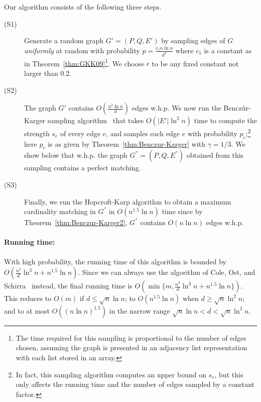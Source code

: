 \documentclass[11pt]{article}
\begin{document}
Our algorithm consists of the following three steps.

\begin{description}

\item[(S1)] Generate a random graph $G'=(P,Q,E')$ by sampling edges of $G$
  {\em uniformly} at random with probability $p = \frac{c_1 n \ln n}{d^2}$
  where $c_1$ is a constant as in Theorem~\ref{thm:GKK09}\footnote{The time
    required for this sampling is proportional to the number of edges chosen,
    assuming the graph is presented in an adjacency list representation with
    each list stored in an array.}.  We choose $\epsilon$ to be any fixed
  constant not larger than $0.2$.

\item[(S2)] The graph $G'$ contains $O( \frac{n^2 \ln n}{d})$ edges w.h.p. We
  now run the Bencz\'{u}r-Karger sampling algorithm~\cite{benczurkarger96} that
  takes $O(|E'|\ln^2 n)$ time to compute the strength $s_e$ of every edge $e$,
  and samples each edge $e$ with probability $p_e$;\footnote{In fact, this
    sampling algorithm computes an upper bound on $s_e$, but this only affects
    the running time and the number of edges sampled by a constant factor.}
  here $p_e$ is as given by Theorem~\ref{thm:Benczur-Karger} with $\gamma =
  1/3$. We show below that w.h.p. the graph $G^{''} = (P,Q,E^{''})$ obtained
  from this sampling contains a perfect matching.

\item[(S3)] Finally, we run the Hopcroft-Karp algorithm to obtain a maximum
  cardinality matching in $G^{''}$ in $O(n^{1.5} \ln n)$ time since by
  Theorem~\ref{thm:Benczur-Karger2}, $G^{''}$ contains $O(n \ln n)$ edges w.h.p.
\end{description}

\paragraph{Running time:} With high probability, the running time of this
algorithm is bounded by $O(\frac{n^2}{d}\ln^3 n + n^{1.5}\ln n)$. Since we can
always use the algorithm of Cole, Ost, and Schirra~\cite{cos:regular2001}
instead, the final running time is $O(\min\{m, \frac{n^2}{d}\ln^3 n +
n^{1.5}\ln n\})$. This reduces to $O(m)$ if $d \le \sqrt{n} \ln n $; to
$O(n^{1.5}\ln n)$ when $d \ge \sqrt{n}\ln^2 n$; and to at most $O((n\ln
n)^{1.5})$ in the narrow range $ \sqrt{n} \ln n < d < \sqrt{n}\ln^2 n$.
\end{document}
